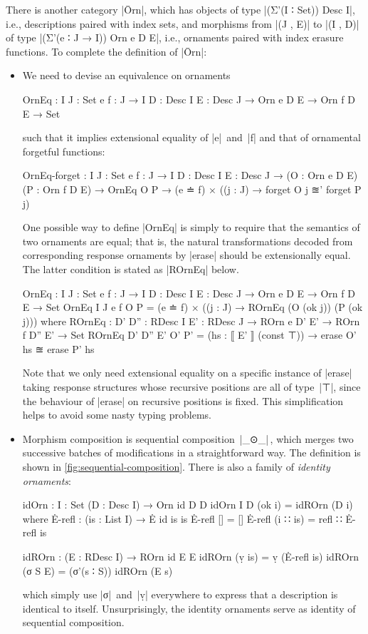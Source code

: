 There is another category |Ōrn|, which has objects of type |(Σ'(I ∶ Set)) Desc I|, i.e., descriptions paired with index sets, and morphisms from |(J , E)| to |(I , D)| of type |(Σ'(e ∶ J → I)) Orn e D E|, i.e., ornaments paired with index erasure functions.
To complete the definition of |Ōrn|:
\begin{itemize}
\item We need to devise an equivalence on ornaments
\begin{code}
OrnEq :  {I J : Set} {e f : J → I} {D : Desc I} {E : Desc J} →
         Orn e D E → Orn f D E → Set
\end{code}
such that it implies extensional equality of |e|~and~|f| and that of ornamental forgetful functions:
\begin{code}
OrnEq-forget :  {I J : Set} {e f : J → I} {D : Desc I} {E : Desc J} →
                (O : Orn e D E) (P : Orn f D E) → OrnEq O P →
                (e ≐ f) × ((j : J) → forget O {j} ≊' forget P {j})
\end{code}
One possible way to define |OrnEq| is simply to require that the semantics of two ornaments are equal; that is, the natural transformations decoded from corresponding response ornaments by |erase| should be extensionally equal.
The latter condition is stated as |ROrnEq| below.
\begin{code}
OrnEq :  {I J : Set} {e f : J → I} {D : Desc I} {E : Desc J} →
         Orn e D E → Orn f D E → Set
OrnEq {I} {J} {e} {f} O P =
  (e ≐ f) × ((j : J) → ROrnEq (O (ok j)) (P (ok j)))
  where
    ROrnEq :  {D' D'' : RDesc I} {E' : RDesc J} →
              ROrn e D' E' → ROrn f D'' E' → Set
    ROrnEq {D'} {D''} {E'} O' P' =
      (hs : ⟦ E' ⟧ (const ⊤)) → erase O' hs ≊ erase P' hs
\end{code}
Note that we only need extensional equality on a specific instance of |erase| taking response structures whose recursive positions are all of type~|⊤|, since the behaviour of |erase| on recursive positions is fixed.
This simplification helps to avoid some nasty typing problems.

\item Morphism composition is sequential composition~|_⊙_|\,, which merges two successive batches of modifications in a straightforward way.
The definition is shown in \autoref{fig:sequential-composition}.
There is also a family of \emph{identity ornaments}:
\begin{code}
idOrn : {I : Set} (D : Desc I) → Orn id D D
idOrn {I} D (ok i) = idROrn (D i)
  where
    Ė-refl : (is : List I) → Ė id is is
    Ė-refl []        = []
    Ė-refl (i ∷ is)  = refl ∷ Ė-refl is

    idROrn : (E : RDesc I) → ROrn id E E
    idROrn (ṿ is)   = ṿ (Ė-refl is)
    idROrn (σ S E)  = (σ'(s ∶ S)) idROrn (E s)
\end{code}
which simply use |σ|~and~|ṿ| everywhere to express that a description is identical to itself.
Unsurprisingly, the identity ornaments serve as identity of sequential composition.
\end{itemize}
